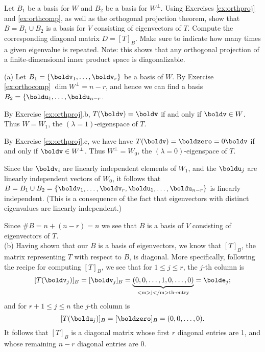 \noindent
Let $B_1$ be a basis for $W$ and $B_2$ be a basis for $W^\perp$. 
\bb
\ii Using Exercises \ref{ex:orthproj} and \ref{ex:orthcomp}, as well as the orthogonal projection theorem, show that $B=B_1\cup B_2$ is a basis for $V$ consisting of eigenvectors of $T$.
\ii Compute the corresponding diagonal matrix $D=[T]_B$. Make sure to indicate how many times a given eigenvalue is repeated.
\ee 
Note: this shows that any orthogonal projection of a finite-dimensional inner product space is  diagonalizable. 
\\
\begin{solution}
\noindent
(a) Let $B_1=\{\boldv_1,\dots, \boldv_r\}$ be a basis of $W$. By Exercise \ref{ex:orthocomp} $\dim W^\perp=n-r$, and hence we can find a basis $B_2=\{\boldu_1,\dots, \boldu_{n-r}$. 

\noindent 
By Exercise \ref{ex:orthproj}.b, $T(\boldv)=\boldv$ if and only if $\boldv\in W$. Thus $W=W_1$, the $(\lambda=1)$-eigenspace of $T$. 

\noindent By Exercise \ref{ex:orthproj}.c, we have have $T(\boldv)=\boldzero=0\boldv$ if and only if $\boldv\in W^\perp$. Thus $W^\perp=W_0$, the $(\lambda=0)$-eigenspace of $T$. 

Since the $\boldv_i$ are linearly independent elements of $W_1$, and the $\boldu_j$ are linearly independent vectors of $W_0$, it follows that $B=B_1\cup B_2=\{\boldv_1,\dots, \boldv_r,\boldu_1,\dots, \boldu_{n-r}\}$ is linearly independent. (This is a consequence of the fact that eigenvectors with distinct eigenvalues are linearly independent.) 

\noindent
Since $\#B=n+(n-r)=n$ we see that $B$ is a basis of $V$ consisting of eigenvectors of $T$.    
\vspace{.1in}
\\
(b) 	Having shown that our $B$ is a basis of eigenvectors, we know that $[T]_B$, the matrix representing $T$ with respect to $B$, is diagonal. More specifically, following the recipe for computing $[T]_B$, we see that for $1\leq j\leq r$, the $j$-th column is 
\[
[T(\boldv_j)]_B=[\boldv_j]_B=\underset{\text{<m>j</m>th-entry}}{\underbrace{(0,0,\dots, 1,0,\dots, 0)}}=\bolde_j;
\]
and for $r+1\leq j\leq n$ the $j$-th column is 
\[
[T(\boldu_j)]_B=[\boldzero]_B=(0,0,\dots, 0).
\]
It follows that $[T]_B$ is a diagonal matrix whose first $r$ diagonal entries are 1, and whose remaining $n-r$ diagonal entries are $0$. 
\end{solution}

